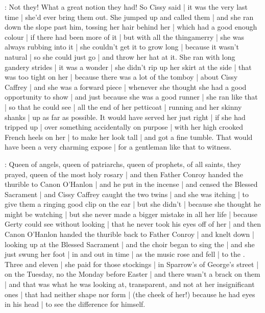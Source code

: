 :
Not they!
What a great notion
they had!
So Cissy said |
it was the very last time |
she'd ever bring them out.
She jumped up and called them |
and she ran down the slope past him,
tossing her hair behind her |
which had a good enough colour |
if there had been more of it |
but with all the thingamerry |
she was always rubbing into it |
she couldn't get it to grow long |
because it wasn't natural |
so she could just go |
and throw her hat at it.
She ran with long gandery strides |
it was a wonder |
she didn't rip up her skirt at the side |
that was too tight on her |%
because there was a lot of the tomboy |
about Cissy Caffrey |
and she was a forward piece |
whenever she thought
she had a good opportunity to show |
and just because she was a good runner |
she ran like that |
so that he could see |
all the end of her petticoat |
running and her skinny shanks |
up as far as possible.
It would have served her just right |
if she had tripped up |
over something accidentally on purpose |
with her high crooked French heels on her |
to make her look tall |
and got a fine tumble.
That would have been
a very charming expose |
for a gentleman like that
to witness.

:
Queen of angels,
queen of patriarchs,
queen of prophets,
of all saints,
they prayed,
queen of the most holy rosary |%
and then Father Conroy
handed the thurible
to Canon O'Hanlon |
and he put in the incense |
and censed the Blessed Sacrament |
and Cissy Caffrey caught the two twins |
and she was itching |
to give them a ringing good clip on the ear |
but she didn't |
because she thought
he might be watching |
but she never made a bigger mistake in all her life |
because Gerty could see without looking |
that he never took his eyes off of her |
and then Canon O'Hanlon
handed the thurible
back to Father Conroy |
and knelt down |
looking up at the Blessed Sacrament |
and the choir
began to sing the  |
and she just swung her foot |
in and out in time |
as the music rose and fell |
to the .
Three and eleven |
she paid for those stockings |%
in Sparrow's of George's street |
on the Tuesday,
no the Monday before Easter |
and there wasn't a brack on them |
and that was what he was looking at,
transparent,
and not at her insignificant ones |
that had neither shape nor form |
(the cheek of her!)
because he had eyes in his head |
to see the difference
for himself.

